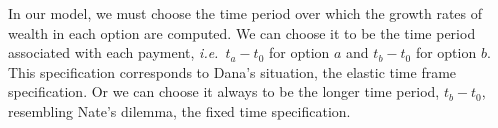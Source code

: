 \documentclass[11pt]{article}
\newcommand{\ie}{{\it i.e.}\ }
\newcommand{\Dt}{\Delta t}
\numberwithin{equation}{section}
\begin{document}
In our model, we must choose the time period over which the growth rates of wealth in each option are computed. We can choose it to be the time period associated with each payment, \ie $t_a-t_0$ for option $a$ and $t_b-t_0$ for option $b$. This specification corresponds to Dana's situation, the elastic time frame specification. Or we can choose it always to be the longer time period, $t_b-t_0$, resembling Nate's dilemma, the fixed time specification.








\end{document}
